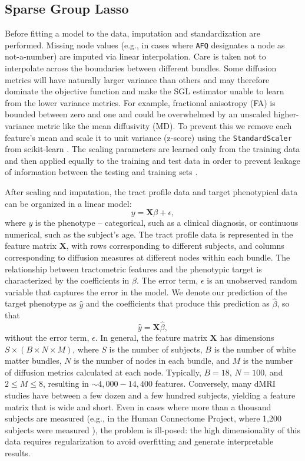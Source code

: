 \documentclass[10pt,letterpaper]{article}
\begin{document}
\subsection*{Sparse Group Lasso}
\label{sec:sgl}

Before fitting a model to the data, imputation and standardization are
performed. Missing node values (e.g., in cases where \texttt{AFQ} designates
a node as not-a-number) are imputed via linear interpolation. Care is taken
not to interpolate across the boundaries between different bundles. Some
diffusion metrics will have naturally larger variance than others and may
therefore dominate the objective function and make the SGL estimator unable
to learn from the lower variance metrics. For example, fractional anisotropy
(FA) is bounded between zero and one and could be overwhelmed by an unscaled
higher-variance metric like the mean diffusivity (MD). To prevent this we
remove each feature's mean and scale it to unit variance (z-score) using the
\lstinline|StandardScaler| from scikit-learn \cite{scikit-learn}. The scaling
parameters are learned only from the training data and then applied equally
to the training and test data in order to prevent leakage of information
between the testing and training sets \cite{kaufman2012leakage}.

After scaling and imputation, the tract profile data and target
phenotypical data can be organized in a linear model:
\begin{equation}
    y = \mathbf{X} \beta + \epsilon,
    \label{eq:lm}
\end{equation}
where $y$ is the phenotype -- categorical, such as a clinical diagnosis,
or continuous numerical, such as the subject's age. The tract profile
data is represented in the feature matrix $\mathbf{X}$, with rows
corresponding to different subjects, and columns corresponding
to diffusion measures at different nodes within each bundle. The
relationship between tractometric features and the phenotypic target is
characterized by the coefficients in $\beta$. The error term, $\epsilon$
is an unobserved random variable that captures the error in the model.
We denote our prediction of the target phenotype as $\hat{y}$ and the
coefficients that produce this prediction as $\hat{\beta}$, so that
\begin{equation}
    \hat{y} = \mathbf{X} \hat{\beta},
    \label{eq:lm-approx}
\end{equation}
without the error term, $\epsilon$. In general, the feature matrix
$\mathbf{X}$ has dimensions $S \times (B \times N \times M)$, where $S$
is the number of subjects, $B$ is the number of white matter bundles,
$N$ is the number of nodes in each bundle, and $M$ is the number of
diffusion metrics calculated at each node. Typically, $B = 18$, $N =
100$, and $2 \le M \le 8$, resulting in $\sim 4,000 - 14,400$ features.
Conversely, many dMRI studies have between a few dozen and a few
hundred subjects, yielding a feature matrix that is wide and short.
Even in cases where more than a thousand subjects are measured (e.g.,
in the Human Connectome Project, where 1,200 subjects were measured
\cite{VanEssen2012}), the problem is ill-posed: the high dimensionality
of this data requires regularization to avoid overfitting and generate
interpretable results.
\end{document}
